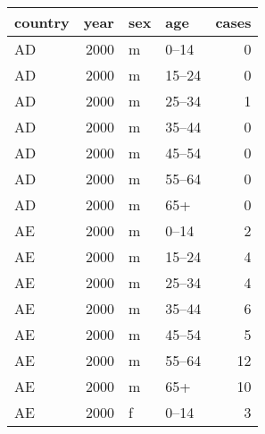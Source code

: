 \begin{tabular}{lrllr}
  \toprule
 country & year & sex & age & cases \\ 
  \midrule
  AD & 2000 & m & 0--14 &   0 \\ 
  AD & 2000 & m & 15--24 &   0 \\ 
  AD & 2000 & m & 25--34 &   1 \\ 
  AD & 2000 & m & 35--44 &   0 \\ 
  AD & 2000 & m & 45--54 &   0 \\ 
  AD & 2000 & m & 55--64 &   0 \\ 
  AD & 2000 & m & 65+ &   0 \\ 
  AE & 2000 & m & 0--14 &   2 \\ 
  AE & 2000 & m & 15--24 &   4 \\ 
  AE & 2000 & m & 25--34 &   4 \\ 
  AE & 2000 & m & 35--44 &   6 \\ 
  AE & 2000 & m & 45--54 &   5 \\ 
  AE & 2000 & m & 55--64 &  12 \\ 
  AE & 2000 & m & 65+ &  10 \\ 
  AE & 2000 & f & 0--14 &   3 \\ 
   \bottomrule
\end{tabular}
